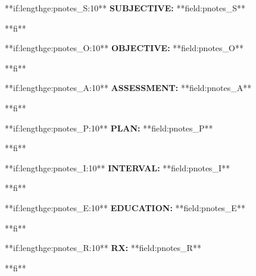 \documentclass{article}
\newcommand{\sheading}[1]{\textbf{#1:}}
\begin{document}
**if:lengthge:pnotes_S:10**
\noindent\sheading{SUBJECTIVE} **field:pnotes_S**
\par
**fi**

**if:lengthge:pnotes_O:10**
\noindent\sheading{OBJECTIVE} **field:pnotes_O**
\par
**fi**

**if:lengthge:pnotes_A:10**
\noindent\sheading{ASSESSMENT} **field:pnotes_A**
\par
**fi**

**if:lengthge:pnotes_P:10**
\noindent\sheading{PLAN} **field:pnotes_P**
\par
**fi**

**if:lengthge:pnotes_I:10**
\noindent\sheading{INTERVAL} **field:pnotes_I**
\par
**fi**

**if:lengthge:pnotes_E:10**
\noindent\sheading{EDUCATION} **field:pnotes_E**
\par
**fi**

**if:lengthge:pnotes_R:10**
\noindent\sheading{RX} **field:pnotes_R**
\par
**fi**
\end{document}
